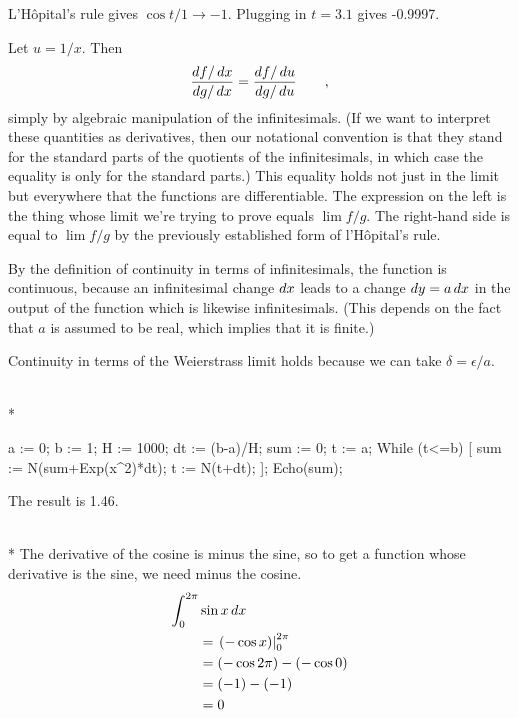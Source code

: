 L'H\^{o}pital's rule gives $\cos t/1\rightarrow -1$. Plugging in $t=3.1$
gives -0.9997.

Let $u=1/x$. Then
\begin{equation*}
  \frac{\der f/\der x}{\der g/\der x}  =   \frac{\der f/\der u}{\der g/\der u}  \qquad ,
\end{equation*}
simply by algebraic manipulation of the infinitesimals. (If we want to interpret these quantities as
derivatives, then our notational convention is that they stand for the standard parts of the quotients
of the infinitesimals, in which case the equality is only for the standard parts.) This equality  holds not just in the limit
but everywhere that the functions are differentiable. The expression on the left is the thing whose limit we're trying to
prove equals $\lim f/g$. The right-hand side is equal to $\lim f/g$ by the previously established form of l'H\^{o}pital's rule.

By the  definition of
continuity in terms of infinitesimals, the function is continuous, because an infinitesimal change $\mathop{d\!} x$ leads
to a change $\mathop{d\!} y=a\mathop{d\!} x$ in the output of the function which is likewise infinitesimals. (This depends on the
fact that $a$ is assumed to be real, which implies that it is finite.)

Continuity in terms of the Weierstrass limit holds because we can take $\delta=\epsilon/a$.



\\*
\restartLineNumbers
\begin{Code}
  a := 0;
  b := 1;
  H := 1000;
  dt := (b-a)/H;
  sum := 0;
  t := a;
  While (t<=b) [
    sum := N(sum+Exp(x^2)*dt);
    t := N(t+dt);
  ];
  Echo(sum);
\end{Code}
The result is 1.46.


\\*
The derivative of the cosine is minus the sine, so to get a function whose
derivative is the sine, we need minus the cosine.
\begin{align*}
  \int_0^{2\pi} & \sin x \mathop{d\!} x \\
    &= \left.(-\cos x)\right|_0^{2\pi} \\
    &= (-\cos 2\pi)-(-\cos 0) \\
    &= (-1)-(-1) \\
    &= 0
\end{align*}

